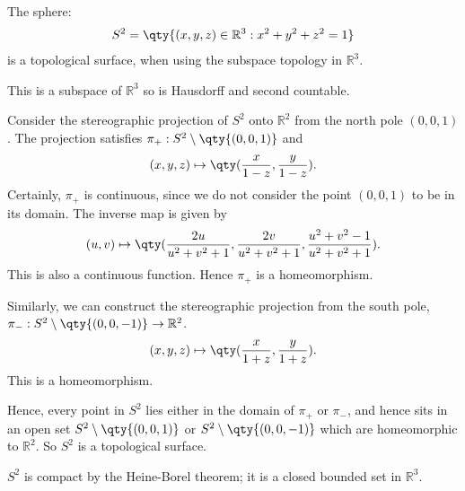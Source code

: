 \begin{example}
	The sphere:
	\begin{align*}
		S^2 = \qty{(x,y,z) \in \mathbb R^3 : x^2 + y^2 + z^2 = 1}
	\end{align*}
	is a topological surface, when using the subspace topology in $\mathbb R^3$.

	This is a subspace of $\mathbb{R}^3$ so is Hausdorff and second countable.
	
	Consider the stereographic projection of $S^2$ onto $\mathbb R^2$ from the north pole $(0,0,1)$.
	The projection satisfies $\pi_+ : S^2 \setminus \qty{(0,0,1)}$ and
	\begin{align*}
		(x,y,z) \mapsto \qty(\frac{x}{1-z}, \frac{y}{1-z}).
	\end{align*}
	Certainly, $\pi_+$ is continuous, since we do not consider the point $(0,0,1)$ to be in its domain.
	The inverse map is given by
	\begin{align*}
		(u,v) \mapsto \qty(\frac{2u}{u^2+v^2+1}, \frac{2v}{u^2+v^2+1}, \frac{u^2+v^2-1}{u^2+v^2+1}).
	\end{align*}
	This is also a continuous function.
	Hence $\pi_+$ is a homeomorphism.

	Similarly, we can construct the stereographic projection from the south pole, $\pi_-: S^2 \setminus \qty{(0,0,-1)} \to \mathbb{R}^2$.
	\begin{align*}
		(x,y,z) \mapsto \qty(\frac{x}{1+z}, \frac{y}{1+z}).
	\end{align*}
	This is a homeomorphism.

	Hence, every point in $S^2$ lies either in the domain of $\pi_+$ or $\pi_-$, and hence sits in an open set $S^2 \setminus \qty{(0,0,1)}$ or $S^2 \setminus \qty{(0,0,-1)}$ which are homeomorphic to $\mathbb R^2$.
	So $S^2$ is a topological surface.
\end{example}

\begin{remark}
	$S^2$ is compact by the Heine-Borel theorem; it is a closed bounded set in $\mathbb R^3$.
\end{remark}

